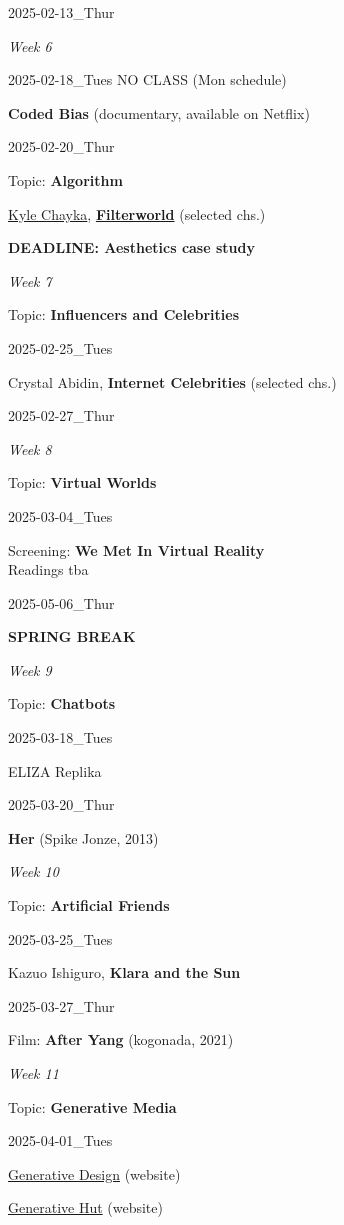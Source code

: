 \documentclass[
  letterpaper,
  DIV=11,
  numbers=noendperiod]{scrartcl}
\begin{document}
2025-02-13\_Thur

\emph{Week 6}

2025-02-18\_Tues NO CLASS (Mon schedule)

\textbf{Coded Bias} (documentary, available on Netflix)

2025-02-20\_Thur

Topic: \textbf{Algorithm}

\href{https://www.kylechayka.com/}{Kyle Chayka},
\href{https://www.kylechayka.com/filterworld}{\textbf{Filterworld}}
(selected chs.)

\textbf{DEADLINE: Aesthetics case study}

\emph{Week 7}

Topic: \textbf{Influencers and Celebrities}

2025-02-25\_Tues

Crystal Abidin, \textbf{Internet Celebrities} (selected chs.)

2025-02-27\_Thur

\emph{Week 8}

Topic: \textbf{Virtual Worlds}

2025-03-04\_Tues

Screening: \textbf{We Met In Virtual Reality}\\
Readings tba

2025-05-06\_Thur

\textbf{SPRING BREAK}

\emph{Week 9}

Topic: \textbf{Chatbots}

2025-03-18\_Tues

ELIZA Replika

2025-03-20\_Thur

\textbf{Her} (Spike Jonze, 2013)

\emph{Week 10}

Topic: \textbf{Artificial Friends}

2025-03-25\_Tues

Kazuo Ishiguro, \textbf{Klara and the Sun}

2025-03-27\_Thur

Film: \textbf{After Yang} (kogonada, 2021)

\emph{Week 11}

Topic: \textbf{Generative Media}

2025-04-01\_Tues

\href{http://www.generative-gestaltung.de/2/}{Generative Design}
(website)

\href{https://www.generativehut.com/}{Generative Hut} (website)
\end{document}

